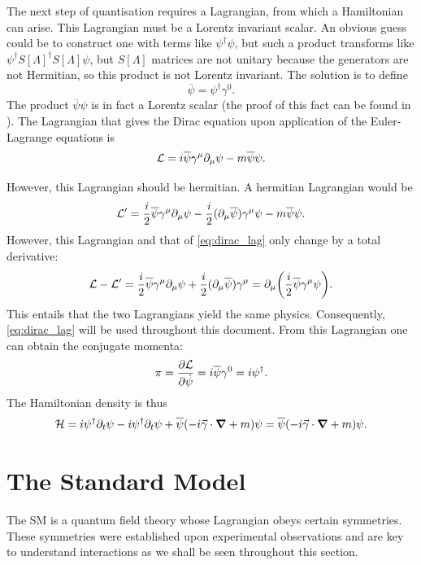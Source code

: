 The next step of quantisation requires a Lagrangian, from which a Hamiltonian can arise. This Lagrangian must be a Lorentz invariant scalar. An obvious guess could be to construct one with terms like $\psi^{\dagger}\psi$, but such a product transforms like $\psi^{\dagger} S[\Lambda]^{\dagger} S[\Lambda] \psi$, but $S[\Lambda]$ matrices are not unitary because the generators are not Hermitian, so this product is not Lorentz invariant. The solution is to define $$\overline{\psi} = \psi^{\dagger}\gamma^0.$$ The product $\overline{\psi}\psi$ is in fact a Lorentz scalar (the proof of this fact can be found in \cite{peskin_introduction_1995}). The Lagrangian that gives the Dirac equation upon application of the Euler-Lagrange equations is 
\begin{equation}\label{eq:dirac_lag}
    \mathcal{L} = i\overline{\psi} \gamma^\mu \partial_{\mu} \psi - m\overline{\psi}\psi.
\end{equation}

However, this Lagrangian should be hermitian. A hermitian Lagrangian would be \cite{lahiri_first_2005} $$\mathcal{L}' = \frac{i}{2}\overline{\psi}\gamma^\mu\partial_{\mu} \psi - \frac{i}{2}(\partial_{\mu} \overline{\psi})\gamma^\mu \psi - m\overline{\psi}\psi.$$ However, this Lagrangian and that of \eqref{eq:dirac_lag} only change by a total derivative:
$$\mathcal{L}-\mathcal{L}' = \frac{i}{2}\overline{\psi}\gamma^\mu\partial_{\mu} \psi + \frac{i}{2}(\partial_{\mu} \overline{\psi})\gamma^\mu = \partial_{\mu} \qty(\frac{i}{2}\overline{\psi}\gamma^\mu \psi).$$ This entails that the two Lagrangians yield the same physics. Consequently, \eqref{eq:dirac_lag} will be used throughout this document. From this Lagrangian one can obtain the conjugate momenta:
$$\pi = \pdv{\mathcal{L}}{\Dot{\psi}} = i\overline{\psi}\gamma^0 = i\psi^{\dagger}.$$ The Hamiltonian density is thus
$$\mathcal{H} = i\psi^{\dagger}\partial_t \psi - i\psi^{\dagger}\partial_t\psi+\overline{\psi}(-i\Vec{\gamma}\cdot \grad +m)\psi = \overline{\psi}(-i\Vec{\gamma}\cdot \grad +m)\psi.$$

\section{The Standard Model}
The SM is a quantum field theory whose Lagrangian obeys certain symmetries. These symmetries were established upon experimental observations and are key to understand interactions as we shall be seen throughout this section. 

